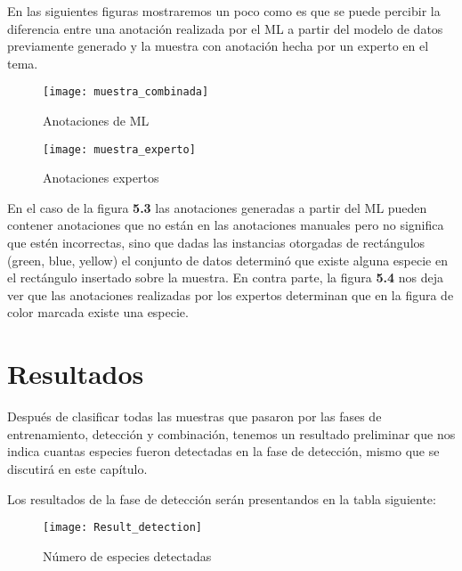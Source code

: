 \break


En las siguientes figuras mostraremos un poco como es que se puede percibir la diferencia entre una anotación realizada por el ML a partir del modelo de datos previamente generado y la muestra con anotación hecha por un experto en el tema. \\

\begin{figure}[H]
  \centering
  \begin{minipage}[b]{0.4\textwidth}
    \texttt{[image: muestra\_combinada]}
    \caption{Anotaciones de ML}
  \end{minipage}
  \hfill
  \begin{minipage}[b]{0.4\textwidth}
    \texttt{[image: muestra\_experto]}
    \caption{Anotaciones expertos}
  \end{minipage}
\end{figure}

En el caso de la figura \textbf{5.3} las anotaciones generadas a partir del ML pueden contener anotaciones que no están en las anotaciones manuales pero no significa que estén incorrectas, sino que dadas las instancias otorgadas de rectángulos (green, blue, yellow) el conjunto de datos determinó que existe alguna especie en el rectángulo insertado sobre la muestra. En contra parte, la figura \textbf{5.4} nos deja ver que las anotaciones realizadas por los expertos determinan que en la figura de color marcada existe una especie.

\break

\chapter{Resultados}
Después de clasificar todas las muestras que pasaron por las fases de entrenamiento, detección y combinación, tenemos un resultado preliminar que nos indica cuantas especies fueron detectadas en la fase de detección, mismo que se discutirá en este capítulo.


Los resultados de la fase de detección serán presentandos en la tabla siguiente:

\begin{figure}[H]
  \centering
  \begin{minipage}[b]{0.5\textwidth}
        \texttt{[image: Result\_detection]}
    \caption{Número de especies detectadas}
  \end{minipage}
\end{figure}

